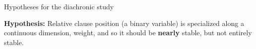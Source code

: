 \documentclass[hyperref={pdfpagelabels=false}]{beamer}
\begin{document}


\begin{frame}{Hypotheses for the diachronic study}
\begin{center}
    \textbf{Hypothesis:} Relative clause position (a binary variable) is specialized along a continuous dimension, weight, and so it should be \textbf{nearly} stable, but not entirely stable.
    \end{center}

\end{frame}




\end{document}
